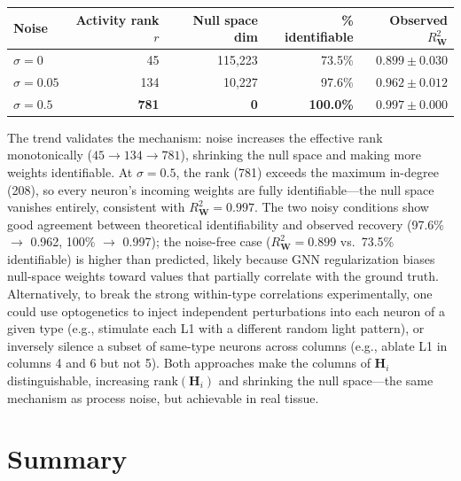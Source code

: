 \documentclass[11pt,a4paper]{article}
\begin{document}
\begin{center}
\begin{tabular}{lrrrr}
\toprule
Noise & Activity rank $r$ & Null space dim & \% identifiable & Observed $R^2_{\mathbf{W}}$ \\
\midrule
$\sigma = 0$    & 45  & 115,223 & 73.5\%  & $0.899 \pm 0.030$ \\
$\sigma = 0.05$ & 134 & 10,227  & 97.6\%  & $0.962 \pm 0.012$ \\
$\sigma = 0.5$  & \textbf{781} & \textbf{0} & \textbf{100.0\%} & $\mathbf{0.997 \pm 0.000}$ \\
\bottomrule
\end{tabular}
\end{center}

The trend validates the mechanism: noise increases the effective rank monotonically ($45 \to 134 \to 781$), shrinking the null space and making more weights identifiable. At $\sigma = 0.5$, the rank (781) exceeds the maximum in-degree (208), so every neuron's incoming weights are fully identifiable---the null space vanishes entirely, consistent with $R^2_{\mathbf{W}} = 0.997$. The two noisy conditions show good agreement between theoretical identifiability and observed recovery (97.6\% $\to$ 0.962, 100\% $\to$ 0.997); the noise-free case ($R^2_{\mathbf{W}} = 0.899$ vs.\ 73.5\% identifiable) is higher than predicted, likely because GNN regularization biases null-space weights toward values that partially correlate with the ground truth. Alternatively, to break the strong within-type correlations experimentally, one could use optogenetics to inject independent perturbations into each neuron of a given type (e.g., stimulate each L1 with a different random light pattern), or inversely silence a subset of same-type neurons across columns (e.g., ablate L1 in columns 4 and 6 but not 5). Both approaches make the columns of $\mathbf{H}_i$ distinguishable, increasing $\text{rank}(\mathbf{H}_i)$ and shrinking the null space---the same mechanism as process noise, but achievable in real tissue.

\section{Summary}
\end{document}
